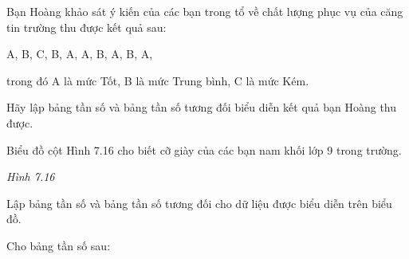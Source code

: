 \begin{exercises}
\begin{questions}[resume=SGK]
        \answerline
        \answerline
        \answerline

        \item Bạn Hoàng khảo sát ý kiến của các bạn trong tổ về chất lượng phục vụ của căng tin trường thu được kết quả sau:

        \begin{center}
            A, B, C, B, A, A, B, A, B, A,
        \end{center}

        trong đó A là mức Tốt, B là mức Trung bình, C là mức Kém.

        Hãy lập bảng tần số và bảng tần số tương đối biểu diễn kết quả bạn Hoàng thu được.

        \answerline
        \answerline
        \answerline
        \answerline

        \item Biểu đồ cột Hình 7.16 cho biết cỡ giày của các bạn nam khối lớp 9 trong trường.

        \begin{center}

            \textit{Hình 7.16}
        \end{center}

        Lập bảng tần số và bảng tần số tương đối cho dữ liệu được biểu diễn trên biểu đồ.

        \answerline
        \answerline
        \answerline
        \answerline

        \item Cho bảng tần số sau:


\end{questions}
\end{exercises}
